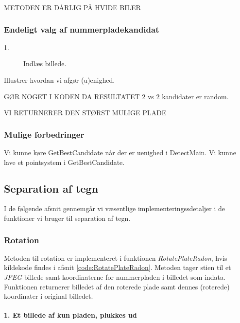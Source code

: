 METODEN ER DÅRLIG PÅ HVIDE BILER




\subsubsection{Endeligt valg af nummerpladekandidat}
\begin{description}
\item[1.] Indlæs billede.
\end{description}


Illustrer hvordan vi afgør (u)enighed. 

GØR NOGET I KODEN DA RESULTATET 2 vs 2 kandidater er random.

VI RETURNERER DEN STØRST MULIGE PLADE

\subsubsection{Mulige forbedringer}
Vi kunne køre GetBestCandidate når der er uenighed i DetectMain.
Vi kunne lave et pointsystem i GetBestCandidate.


\subsection{Separation af tegn}

I de følgende afsnit gennemgår vi væsentlige implementeringssdetaljer i de funktioner vi bruger til separation af tegn. 

\subsubsection{Rotation}
\label{sec:implementation/sep/rotation}

Metoden til rotation er implementeret i funktionen \textit{RotatePlateRadon}, hvis kildekode findes i afsnit \vref{code:RotatePlateRadon}. Metoden tager stien til et \textit{JPEG}-billede samt koordinaterne for nummerpladen i billedet som indata. Funktionen returnerer billedet af den roterede plade samt dennes (roterede) koordinater i original billedet.


\paragraph{1. Et billede af kun pladen, plukkes ud}

